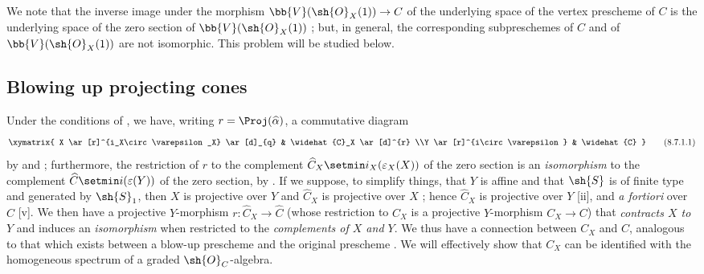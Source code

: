 We note that the inverse image under the morphism $\bb{V}(\sh{O}_X(1))\to C$ of the underlying space of the vertex prescheme of $C$ is the underlying space of the zero section of $\bb{V}(\sh{O}_X(1))$ ;
but, in general, the corresponding subpreschemes of $C$ and of $\bb{V}(\sh{O}_X(1))$ are not isomorphic.
This problem will be studied below.


\subsection{Blowing up projecting cones}
\label{subsection:II.8.7}

\begin{env}[8.7.1]
\label{II.8.7.1}
Under the conditions of , we have, writing $r=\Proj(\widehat{\alpha})$, a commutative diagram
\[
\label{II.8.7.1.1}
  \xymatrix{
    X
      \ar[r]^{i_X\circ\varepsilon_X}
      \ar[d]_{q}
  & \widehat{C}_X
      \ar[d]^{r}
  \\Y
      \ar[r]^{i\circ\varepsilon}
  & \widehat{C}
  }
\tag{8.7.1.1}
\]
by  and ;
furthermore, the restriction of $r$ to the complement $\widehat{C}_X\setmin i_X(\varepsilon_X(X))$ of the zero section is an \emph{isomorphism} to the complement $\widehat{C}\setmin i(\varepsilon(Y))$ of the zero section, by .
If we suppose, to simplify things, that $Y$ is affine and that $\sh{S}$ is of finite type and generated by $\sh{S}_1$, then $X$ is projective over $Y$ and $\widehat{C}_X$ is projective over $X$ ; hence $\widehat{C}_X$ is projective over $Y$ [ii], and \emph{a fortiori} over $\widehat{C}$ [v].
We then have a projective $Y$-morphism $r:\widehat{C}_X\to\widehat{C}$ (whose restriction to $C_X$ is a projective $Y$-morphism $C_X\to C$) that \emph{contracts $X$ to $Y$} and induces an \emph{isomorphism} when restricted to the \emph{complements of $X$ and $Y$}.
We thus have a connection between $C_X$ and $C$, analogous to that which exists between a blow-up prescheme and the original prescheme .
We will effectively show that $C_X$ can be identified with the homogeneous spectrum of a graded $\sh{O}_C$-algebra.
\end{env}

